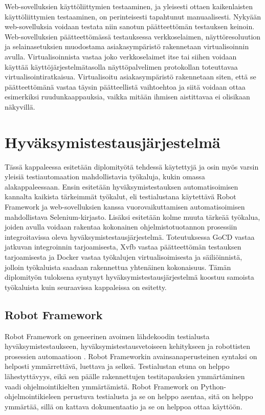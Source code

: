   Web-sovelluksien käyttöliittymien testaaminen, ja yleisesti ottaen kaikenlaisten käyttöliittymien testaaminen, on perinteisesti tapahtunut manuaalisesti.
  Nykyään web-sovelluksia voidaan testata niin sanotun päätteettömän testauksen keinoin.
  Web-sovelluksien päätteettömässä testauksessa verkkoselaimen, näyttöresoluution ja selainasetuksien muodostama asiakasympäristö rakennetaan virtualisoinnin avulla.
  Virtualisoinnista vastaa joko verkkoselaimet itse tai siihen voidaan käyttää käyttöjärjestelmätasolla näyttöpalvelimen protokollan toteuttavaa virtualisointiratkaisua.
  Virtualisoitu asiakasympäristö rakennetaan siten, että se päätteettömänä vastaa täysin päätteellistä vaihtoehtoa ja siitä voidaan ottaa esimerkiksi ruudunkaappauksia, vaikka mitään ihmisen aistittavaa ei olisikaan näkyvillä.

\section{Hyväksymistestausjärjestelmä} \label{ch:08_hyvaksymistestausjarjestelma}

  Tässä kappaleessa esitetään diplomityötä tehdessä käytettyjä ja osin myös varsin yleisiä testiautomaation mahdollistavia työkaluja, kukin omassa alakappaleessaan.
  Ensin esitetään hyväksymistestauksen automatisoimisen kannalta kaikista tärkeimmät työkalut, eli testialustana käytettävä Robot Framework ja web-sovelluksien kanssa vuorovaikuttamisen automatisoimisen mahdollistava Selenium-kirjasto.
  Lisäksi esitetään kolme muuta tärkeää työkalua, joiden avulla voidaan rakentaa kokonainen ohjelmistotuotannon prosessiin integroitavissa oleva hyväksymistestausjärjestelmä.
  Toteutuksessa GoCD vastaa jatkuvan integroinnin tarjoamisesta, Xvfb vastaa päätteettömän testauksen tarjoamisesta ja Docker vastaa työkalujen virtualisoimisesta ja säiliöinnistä, jolloin työkaluista saadaan rakennettua yhtenäinen kokonaisuus.
  Tämän diplomityön tuloksena syntynyt hyväksymistestausjärjestelmä koostuu samoista työkaluista kuin seuraavissa kappaleissa on esitetty.

  \subsection{Robot Framework} \label{ch:08_robot_framework}

    Robot Framework on geneerinen avoimen lähdekoodin testialusta hyväksymistestaukseen, hyväksymistestausvetoiseen kehitykseen ja robottisten prosessien automaatioon \parencite{robot_framework_user_guide}.
    Robot Frameworkin avainsanaperusteinen syntaksi on helposti ymmärrettävä, luettava ja selkeä.
    Testialustan etuna on helppo lähestyttävyys, eikä sen päälle rakennettujen testitapauksien ymmärtäminen vaadi ohjelmointikielten ymmärtämistä.
    Robot Framework on Python-ohjelmointikieleen perustuva testialusta ja se on helppo asentaa, sitä on helppo ymmärtää, sillä on kattava dokumentaatio ja se on helppoa ottaa käyttöön.

